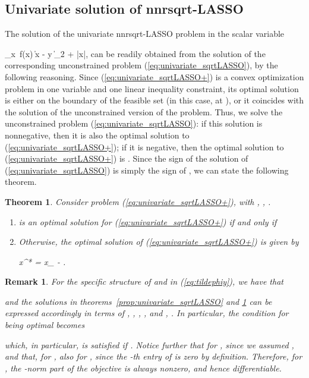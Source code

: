 \documentclass[11pt]{article}
\newcommand{\tran}{^{\top}}
\newcommand{\qed}{{\hfill }}
\newcommand{\lam}{\lambda}
\newcommand{\beq}{}
\newcommand{\ben}{\begin{enumerate}}
\newcommand{\een}{\end{enumerate}}
\newcommand{\ped}[1]{{_{\mathrm{#1}}}}
\newtheorem{theorem}{Theorem}
\newtheorem{remark}{Remark}
\begin{document}
\subsection{Univariate solution of nnrsqrt-LASSO}
The solution of the univariate nnrsqrt-LASSO problem in the scalar variable 
\beq
\min_{x}\,  f(x)\doteq
\|\tilde \phi x - \tilde y \|_2 +  \lam |x|,
\label{eq:univariate_sqrtLASSO+}
\eeq
can be readily obtained from the solution of the corresponding unconstrained problem (\ref{eq:univariate_sqrtLASSO}), by the following reasoning. Since (\ref{eq:univariate_sqrtLASSO+}) is a convex optimization problem in one variable and one linear inequality constraint, its optimal solution is either on the boundary of the feasible set (in this case, at ), or it coincides with the solution of the unconstrained version of the problem.
Thus, we solve the unconstrained problem  (\ref{eq:univariate_sqrtLASSO}): if this solution is nonnegative, then it is also the optimal solution to  (\ref{eq:univariate_sqrtLASSO+}); if it is negative, then the optimal solution to (\ref{eq:univariate_sqrtLASSO+}) is . Since the sign of the solution of  (\ref{eq:univariate_sqrtLASSO}) is simply the sign of , we can state the following theorem.

\begin{theorem} 
\label{prop:univariate_sqrtLASSO+}
Consider problem (\ref{eq:univariate_sqrtLASSO+}), with , , .
\ben
\item  is an optimal solution for (\ref{eq:univariate_sqrtLASSO+}) if and only if

\item Otherwise, the optimal solution of (\ref{eq:univariate_sqrtLASSO+}) is given by
\beq
x^* = x\ped{ls} - \frac{\lam}{\|\tilde \phi\|_2^2}\sqrt{\frac{
\| \tilde \phi\|_2^2 \| \tilde y \|_2^2 - (\tilde  \phi\tran \tilde y )^2}
{\|\tilde \phi\|_2^2  -\lam^2 }}
.
\label{eq:univariate_sqrtLASSO+_nzsol}
\eeq
\een
\end{theorem}



\begin{remark}\rm
For the specific structure of  and  in (\ref{eq:tildephiy}), we have that

and the solutions in theorems~\ref{prop:univariate_sqrtLASSO} and \ref{prop:univariate_sqrtLASSO+} can be expressed accordingly in terms of
, 
, ,  , and , .
In particular, the condition for  being optimal becomes

which, in particular, is satisfied if .\newline 
 Notice further that   for , since we assumed , and that,
 for ,  also for , since the -th entry of  is zero by definition.
Therefore, for , the -norm part of the objective is always nonzero, and hence differentiable.\qed
\end{remark}
\end{document}
